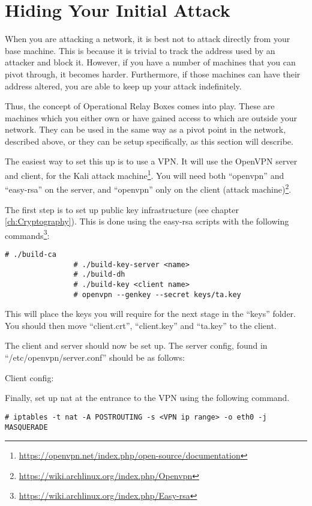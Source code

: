 	\section{Hiding Your Initial Attack}
		When you are attacking a network, it is best not to attack directly from your base machine. 
		This is because it is trivial to track the address used by an attacker and block it. 
		However, if you have a number of machines that you can pivot through, it becomes harder. 
		Furthermore, if those machines can have their address altered, you are able to keep up your attack indefinitely. 

		Thus, the concept of Operational Relay Boxes comes into play.
		These are machines which you either own or have gained access to which are outside your network. 
		They can be used in the same way as a pivot point in the network, described above, or they can be setup specifically, as this section will describe. 

		 
		The easiest way to set this up is to use a VPN. 
		It will use the OpenVPN server and client, for the Kali attack machine\footnote{\url{https://openvpn.net/index.php/open-source/documentation}}.
		You will need both ``openvpn'' and ``easy-rsa'' on the server, and ``openvpn'' only on the client (attack machine)\footnote{\url{https://wiki.archlinux.org/index.php/Openvpn}}. 
		
		The first step is to set up public key infrastructure (see chapter \ref{ch:Cryptography}).
		This is done using the easy-rsa scripts with the following commands\footnote{\url{https://wiki.archlinux.org/index.php/Easy-rsa}}:
			\begin{lstlisting}[style=CLI]
				# ./build-ca
				# ./build-key-server <name>
				# ./build-dh
				# ./build-key <client name>
				# openvpn --genkey --secret keys/ta.key
			\end{lstlisting}
		This will place the keys you will require for the next stage in the ``keys'' folder. 
		You should then move ``client.crt'', ``client.key'' and ``ta.key'' to the client. 

		The client and server should now be set up. 
		The server config, found in ``/etc/openvpn/server.conf'' should be as follows:
		
		Client config:
		
		Finally, set up nat at the entrance to the VPN using the following command. 
			\begin{lstlisting}[style=CLI]
				# iptables -t nat -A POSTROUTING -s <VPN ip range> -o eth0 -j MASQUERADE
			\end{lstlisting}

